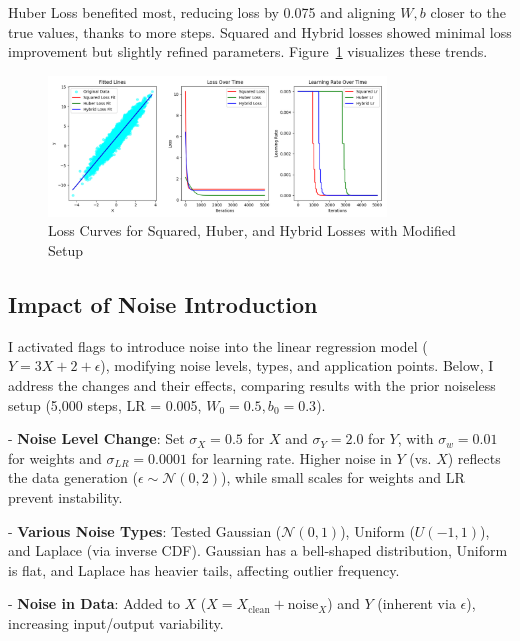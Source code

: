 \documentclass{article}
\begin{document}
Huber Loss benefited most, reducing loss by 0.075 and aligning \( W, b \) closer to the true values, thanks to more steps. Squared and Hybrid losses showed minimal loss improvement but slightly refined parameters. Figure~\ref{fig:patience_curves} visualizes these trends.

\begin{figure}[h]
    \centering
    \includegraphics[width=0.8\textwidth]{assets/patience.png}
    \caption{Loss Curves for Squared, Huber, and Hybrid Losses with Modified Setup}
    \label{fig:patience_curves}
\end{figure}

\subsection{Impact of Noise Introduction}

I activated flags to introduce noise into the linear regression model (\( Y = 3X + 2 + \epsilon \)), modifying noise levels, types, and application points. Below, I address the changes and their effects, comparing results with the prior noiseless setup (5,000 steps, LR = 0.005, \( W_0 = 0.5, b_0 = 0.3 \)).

- \textbf{Noise Level Change}: Set \( \sigma_X = 0.5 \) for \( X \) and \( \sigma_Y = 2.0 \) for \( Y \), with \( \sigma_w = 0.01 \) for weights and \( \sigma_{LR} = 0.0001 \) for learning rate. Higher noise in \( Y \) (vs. \( X \)) reflects the data generation (\( \epsilon \sim \mathcal{N}(0, 2) \)), while small scales for weights and LR prevent instability.

- \textbf{Various Noise Types}: Tested Gaussian (\( \mathcal{N}(0, 1) \)), Uniform (\( U(-1, 1) \)), and Laplace (via inverse CDF). Gaussian has a bell-shaped distribution, Uniform is flat, and Laplace has heavier tails, affecting outlier frequency.

- \textbf{Noise in Data}: Added to \( X \) (\( X = X_{\text{clean}} + \text{noise}_X \)) and \( Y \) (inherent via \( \epsilon \)), increasing input/output variability.
\end{document}
